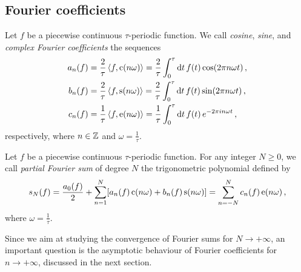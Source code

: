 \subsection{Fourier coefficients}
\begin{definition}
  \label{def:fourier-coef}
  Let $f$ be a piecewise continuous $\tau$-periodic function. We call \emph{cosine},
  \emph{sine}, and \emph{complex Fourier coefficients} the sequences
  \begin{align}
    a_n(f)&=\frac{2}{\tau}\braket{f,\operatorname{c}(n\omega)}
    =\frac{2}{\tau}\int_0^{\tau}\mathrm{d} t\,f(t)\cos(2\pi n\omega t)\,,
    \label{eq:fourier-an}\\
    b_n(f)&=\frac{2}{\tau}\braket{f,\operatorname{s}(n\omega)}
    =\frac{2}{\tau}\int_0^{\tau}\mathrm{d} t\,f(t)\sin(2\pi n\omega t)\,,
    \label{eq:fourier-bn}\\
    c_n(f)&=\frac{1}{\tau}\braket{f,\operatorname{e}(n\omega)}
    =\frac{1}{\tau}\int_0^{\tau}\mathrm{d} t\,f(t)\,e^{-2\pi i n\omega t}\,,
    \label{eq:fourier-cn}
  \end{align}
  respectively, where $n\in\mathbb{Z}$ and $\omega=\frac{1}{\tau}$.
\end{definition}
\begin{definition}
  \label{def:fourier-partial}
  Let $f$ be a piecewise continuous $\tau$-periodic function. For any integer $N\geq 0$,
  we call \emph{partial Fourier sum} of degree $N$ the trigonometric polynomial defined by
  \begin{equation}
    s_N(f)=\frac{a_0(f)}{2}+\sum_{n=1}^N[a_n(f)\operatorname{c}(n\omega)+b_n(f)\operatorname{s}(n\omega)]=
    \sum_{n=-N}^{N}c_n(f)\operatorname{e}(n\omega)\,,
  \end{equation}
  where $\omega=\frac{1}{\tau}$.
\end{definition}
Since we aim at studying the convergence of Fourier sums for $N\to+\infty$, an important
question is the asymptotic behaviour of Fourier coefficients for $n\to+\infty$, discussed
in the next section.
